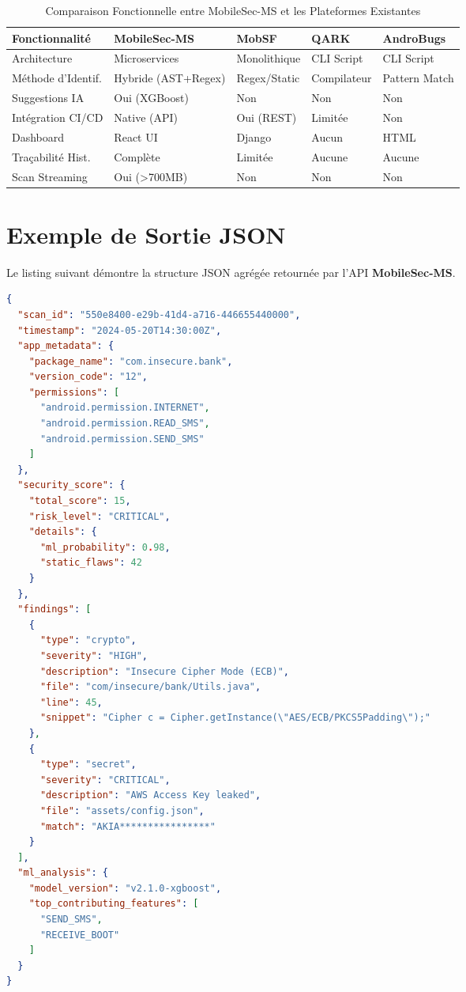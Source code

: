 \documentclass[
  journal=largetwo,
  manuscript=article-type,
  year=2025,
  volume=1,
]{cup-journal}
\begin{document}
\begin{table}[hbt!]
\centering
\caption{Comparaison Fonctionnelle entre MobileSec-MS et les Plateformes Existantes}
\label{tab:func_comparison}
\begin{tabular}{p{3cm}p{3cm}p{3cm}p{3cm}p{3cm}}
\toprule
\textbf{Fonctionnalité} & \textbf{MobileSec-MS} & \textbf{MobSF} & \textbf{QARK} & \textbf{AndroBugs} \\
\midrule
Architecture & Microservices & Monolithique & CLI Script & CLI Script \\
Méthode d'Identif. & Hybride (AST+Regex) & Regex/Static & Compilateur & Pattern Match \\
Suggestions IA & Oui (XGBoost) & Non & Non & Non \\
Intégration CI/CD & Native (API) & Oui (REST) & Limitée & Non \\
Dashboard & React UI & Django & Aucun & HTML \\
Traçabilité Hist. & Complète & Limitée & Aucune & Aucune \\
Scan Streaming & Oui (>700MB) & Non & Non & Non \\
\bottomrule
\end{tabular}
\end{table}

\section{Exemple de Sortie JSON}
\label{app:json_output}

Le listing suivant démontre la structure JSON agrégée retournée par l'API \textbf{MobileSec-MS}.

\begin{lstlisting}[language=json, caption={Sortie JSON Tronquée de l'API MobileSec-MS}]
{
  "scan_id": "550e8400-e29b-41d4-a716-446655440000",
  "timestamp": "2024-05-20T14:30:00Z",
  "app_metadata": {
    "package_name": "com.insecure.bank",
    "version_code": "12",
    "permissions": [
      "android.permission.INTERNET",
      "android.permission.READ_SMS",
      "android.permission.SEND_SMS"
    ]
  },
  "security_score": {
    "total_score": 15,
    "risk_level": "CRITICAL",
    "details": {
      "ml_probability": 0.98,
      "static_flaws": 42
    }
  },
  "findings": [
    {
      "type": "crypto",
      "severity": "HIGH",
      "description": "Insecure Cipher Mode (ECB)",
      "file": "com/insecure/bank/Utils.java",
      "line": 45,
      "snippet": "Cipher c = Cipher.getInstance(\"AES/ECB/PKCS5Padding\");"
    },
    {
      "type": "secret",
      "severity": "CRITICAL",
      "description": "AWS Access Key leaked",
      "file": "assets/config.json",
      "match": "AKIA****************"
    }
  ],
  "ml_analysis": {
    "model_version": "v2.1.0-xgboost",
    "top_contributing_features": [
      "SEND_SMS",
      "RECEIVE_BOOT"
    ]
  }
}
\end{lstlisting}
\end{document}
